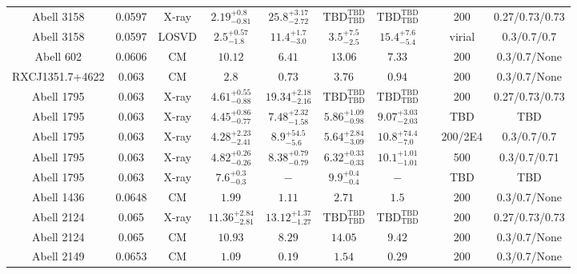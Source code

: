 \begin{table}
\begin{tabular}{cccccccccc}
Abell 3158 & 0.0597 & X-ray & ${2.19}^{+0.8}_{-0.81}$ & ${25.8}^{+3.17}_{-2.72}$ & ${\mathrm{TBD}}^{\mathrm{TBD}}_{\mathrm{TBD}}$ & ${\mathrm{TBD}}^{\mathrm{TBD}}_{\mathrm{TBD}}$ & \citet{BA14.1} & 200 & 0.27/0.73/0.73 \\
Abell 3158 & 0.0597 & LOSVD & ${2.5}^{+0.57}_{-1.8}$ & ${11.4}^{+1.7}_{-3.0}$ & ${3.5}^{+7.5}_{-2.5}$ & ${15.4}^{+7.6}_{-5.4}$ & \citet{LO06.1} & virial & 0.3/0.7/0.7 \\
Abell 602 & 0.0606 & CM & ${10.12}^{}_{}$ & ${6.41}^{}_{}$ & ${13.06}^{}_{}$ & ${7.33}^{}_{}$ & \citet{RI06.1} & 200 & 0.3/0.7/None \\
RXCJ1351.7+4622 & 0.063 & CM & ${2.8}^{}_{}$ & ${0.73}^{}_{}$ & ${3.76}^{}_{}$ & ${0.94}^{}_{}$ & \citet{RI06.1} & 200 & 0.3/0.7/None \\
Abell 1795 & 0.063 & X-ray & ${4.61}^{+0.55}_{-0.88}$ & ${19.34}^{+2.18}_{-2.16}$ & ${\mathrm{TBD}}^{\mathrm{TBD}}_{\mathrm{TBD}}$ & ${\mathrm{TBD}}^{\mathrm{TBD}}_{\mathrm{TBD}}$ & \citet{BA14.1} & 200 & 0.27/0.73/0.73 \\
Abell 1795 & 0.063 & X-ray & ${4.45}^{+0.86}_{-0.77}$ & ${7.48}^{+2.32}_{-1.58}$ & ${5.86}^{+1.09}_{-0.98}$ & ${9.07}^{+3.03}_{-2.03}$ & \citet{SC06.1} & TBD & TBD \\
Abell 1795 & 0.063 & X-ray & ${4.28}^{+2.23}_{-2.41}$ & ${8.9}^{+54.5}_{-5.6}$ & ${5.64}^{+2.84}_{-3.09}$ & ${10.8}^{+74.4}_{-7.0}$ & \citet{VO06.1} & 200/2E4 & 0.3/0.7/0.7 \\
Abell 1795 & 0.063 & X-ray & ${4.82}^{+0.26}_{-0.26}$ & ${8.38}^{+0.79}_{-0.79}$ & ${6.32}^{+0.33}_{-0.33}$ & ${10.1}^{+1.01}_{-1.01}$ & \citet{VI05.1} & 500 & 0.3/0.7/0.71 \\
Abell 1795 & 0.063 & X-ray & ${7.6}^{+0.3}_{-0.3}$ & ${-}^{}_{}$ & ${9.9}^{+0.4}_{-0.4}$ & ${-}^{}_{}$ & \citet{XU01.1} & TBD & TBD \\
Abell 1436 & 0.0648 & CM & ${1.99}^{}_{}$ & ${1.11}^{}_{}$ & ${2.71}^{}_{}$ & ${1.5}^{}_{}$ & \citet{RI06.1} & 200 & 0.3/0.7/None \\
Abell 2124 & 0.065 & X-ray & ${11.36}^{+2.84}_{-2.81}$ & ${13.12}^{+1.37}_{-1.27}$ & ${\mathrm{TBD}}^{\mathrm{TBD}}_{\mathrm{TBD}}$ & ${\mathrm{TBD}}^{\mathrm{TBD}}_{\mathrm{TBD}}$ & \citet{BA14.1} & 200 & 0.27/0.73/0.73 \\
Abell 2124 & 0.065 & CM & ${10.93}^{}_{}$ & ${8.29}^{}_{}$ & ${14.05}^{}_{}$ & ${9.42}^{}_{}$ & \citet{RI06.1} & 200 & 0.3/0.7/None \\
Abell 2149 & 0.0653 & CM & ${1.09}^{}_{}$ & ${0.19}^{}_{}$ & ${1.54}^{}_{}$ & ${0.29}^{}_{}$ & \citet{RI06.1} & 200 & 0.3/0.7/None \\

\end{tabular}
\end{table}
